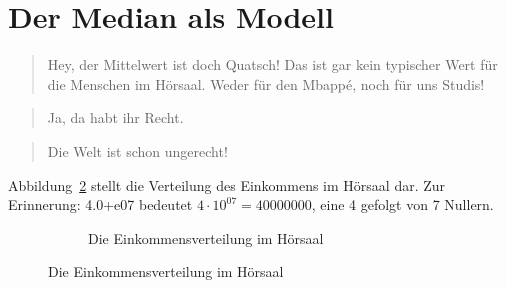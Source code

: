 \documentclass[
  letterpaper,
  oneside,
  open=any]{scrbook}
\theoremstyle{definition}
\theoremstyle{definition}
\theoremstyle{definition}
\theoremstyle{remark}
\begin{document}
\section{Der Median als Modell}\label{sec-median}

\begin{quote}
{} Hey, der Mittelwert ist doch Quatsch! Das ist gar kein
typischer Wert für die Menschen im Hörsaal. Weder für den Mbappé, noch
für uns Studis!
\end{quote}

\begin{quote}
{} Ja, da habt ihr Recht.
\end{quote}

\begin{quote}
{} Die Welt ist schon ungerecht!
\end{quote}

Abbildung~\ref{fig-mbappe} stellt die Verteilung des Einkommens im
Hörsaal dar. Zur Erinnerung: 4.0+e07 bedeutet
\(4 \cdot 10^{07} = 40000000\), eine 4 gefolgt von 7 Nullern.

\begin{figure}

\begin{minipage}{\linewidth}

\begin{figure}[H]


\caption{\label{fig-mbappe}Die Einkommensverteilung im Hörsaal}

\end{figure}%

\end{minipage}%

\end{figure}%
\end{document}
